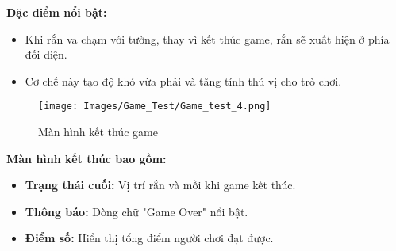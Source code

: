 \noindent \textbf{Đặc điểm nổi bật:}
\begin{itemize}
    \itemsep0.2cm
    \item Khi rắn va chạm với tường, thay vì kết thúc game, rắn sẽ xuất hiện ở phía đối diện.
    \item Cơ chế này tạo độ khó vừa phải và tăng tính thú vị cho trò chơi.
\end{itemize}

\vspace{0.5cm}
\begin{figure}[H]
    \centering
    \texttt{[image: Images/Game\_Test/Game\_test\_4.png]}
    \caption{Màn hình kết thúc game}
    \label{fig:game_test_4}
\end{figure}

\noindent \textbf{Màn hình kết thúc bao gồm:}
\begin{itemize}
    \itemsep0.2cm
    \item \textbf{Trạng thái cuối:} Vị trí rắn và mồi khi game kết thúc.
    \item \textbf{Thông báo:} Dòng chữ "Game Over" nổi bật.
    \item \textbf{Điểm số:} Hiển thị tổng điểm người chơi đạt được.
\end{itemize}